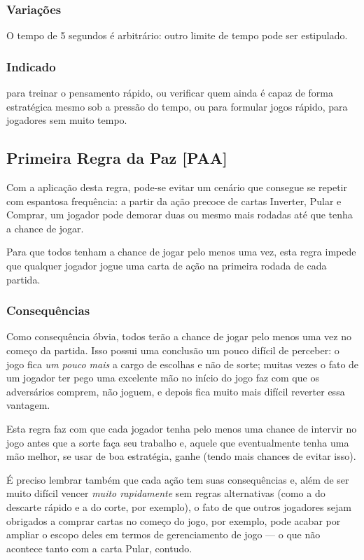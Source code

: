 \subsubsection{Variações}

O tempo de 5 segundos é arbitrário: outro limite de tempo pode ser estipulado.

\subsubsection{Indicado} 

para treinar o pensamento rápido, ou verificar quem ainda é capaz de forma estratégica mesmo sob a pressão do tempo, ou para formular jogos rápido, para jogadores sem muito tempo.

\subsection{Primeira Regra da Paz [PAA]}

\label{primeirapaz}

Com a aplicação desta regra, pode-se evitar um cenário que consegue se repetir com espantosa frequência: a partir da ação precoce de cartas Inverter, Pular e Comprar, um jogador pode demorar duas ou mesmo mais rodadas até que tenha a chance de jogar.

Para que todos tenham a chance de jogar pelo menos uma vez, esta regra impede que qualquer jogador jogue uma carta de ação na primeira rodada de cada partida.

\subsubsection{Consequências}

Como consequência óbvia, todos terão a chance de jogar pelo menos uma vez no começo da partida. Isso possui uma conclusão um pouco difícil de perceber: o jogo fica \emph{um pouco mais} a cargo de escolhas e não de sorte; muitas vezes o fato de um jogador ter pego uma excelente mão no início do jogo faz com que os adversários comprem, não joguem, e depois fica muito mais difícil reverter essa vantagem.

Esta regra faz com que cada jogador tenha pelo menos uma chance de intervir no jogo antes que a sorte faça seu trabalho e, aquele que eventualmente tenha uma mão melhor, se usar de boa estratégia, ganhe (tendo mais chances de evitar isso).

É preciso lembrar também que cada ação tem suas consequências e, além de ser muito difícil vencer \emph{muito rapidamente} sem regras alternativas (como a do descarte rápido e a do corte, por exemplo), o fato de que outros jogadores sejam obrigados a comprar cartas no começo do jogo, por exemplo, pode acabar por ampliar o escopo deles em termos de gerenciamento de jogo --- o que não acontece tanto com a carta Pular, contudo.

